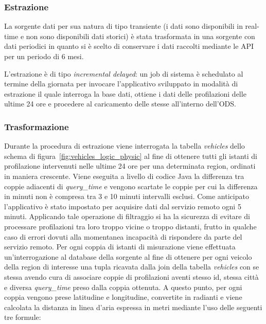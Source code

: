 \subsubsection{Estrazione}

La sorgente dati per sua natura di tipo transiente (i dati sono disponibili in
real-time e non sono disponibili dati storici) è stata trasformata in una
sorgente con dati periodici in quanto si è scelto di conservare i dati raccolti
mediante le API per un periodo di 6 mesi.

L'estrazione è di tipo \textit{incremental delayed}: un job di sistema è
schedulato al termine della giornata per invocare l'applicativo sviluppato in
modalità di estrazione il quale interroga la base dati, ottiene i dati delle
profilazioni delle ultime 24 ore e procedere al caricamento delle stesse
all'interno dell'ODS.

\subsubsection{Trasformazione}

Durante la procedura di estrazione viene interrogata la tabella
\textit{vehicles} dello schema di figura~\ref{fig:vehicles_logic_physic} al fine
di ottenere tutti gli istanti di profilazione intervenuti nelle ultime 24 ore
per una determinata region, ordinati in maniera crescente. Viene eseguita
a livello di codice Java la differenza tra coppie adiacenti di
\textit{query\_time} e vengono scartate le coppie per cui la differenza in
minuti non è compresa tra 3 e 10 minuti intervalli esclusi. Come anticipato
l'applicativo è stato impostato per acquisire dati dal servizio remoto ogni 5
minuti. Applicando tale operazione di filtraggio si ha la sicurezza di evitare
di processare profilazioni tra loro troppo vicine o troppo distanti, frutto in
qualche caso di errori dovuti alla momentanea incapacità di rispondere da parte
del servizio remoto. Per ogni coppia di istanti di misurazione viene effettuata
un'interrogazione al database della sorgente al fine di ottenere per ogni veicolo
della region di interesse una tupla ricavata dalla join della tabella
\textit{vehicles} con se stessa avendo cura di associare coppie di profilazioni
aventi stesso id, stessa città e diversa \textit{query\_time} preso dalla coppia
ottenuta. A questo punto, per ogni coppia vengono prese latitudine e longitudine,
convertite in radianti e viene calcolata la distanza in linea d'aria espressa in
metri mediante l'uso delle seguenti tre formule:

